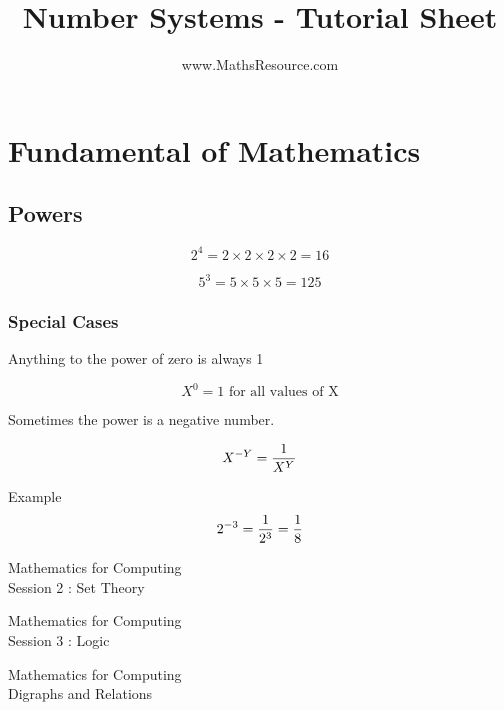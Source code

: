 




\title{Number Systems - Tutorial Sheet}
\author{www.MathsResource.com}


\maketitle
\Large

\section{Fundamental of Mathematics}

\subsection{Powers}

\[  2^ 4 = 2 \times 2 \times 2 \times 2 = 16 \]

\[  5^ 3 = 5 \times 5 \times 5 =125 \]

\subsubsection{Special Cases}

Anything to the power of zero is always 1

\[  X^ 0 = 1 \mbox{ for all values of X} \]

Sometimes the power is a negative number.

\[  X^{-Y} = { 1 \over X^Y}  \]

Example 
\[  2^{-3} = { 1 \over 2^3} = { 1 \over 8}  \]


\newpage
\begin{center}
	\huge{Mathematics for Computing}\\
	{\LARGE Session 2 : Set Theory}
\end{center}


\newpage
\newpage
\begin{center}
	\huge{Mathematics for Computing}\\
	{\LARGE Session 3 : Logic}
\end{center}

\newpage
\begin{center}
	\huge{Mathematics for Computing}\\
	\LARGE{Digraphs and Relations}
\end{center}



